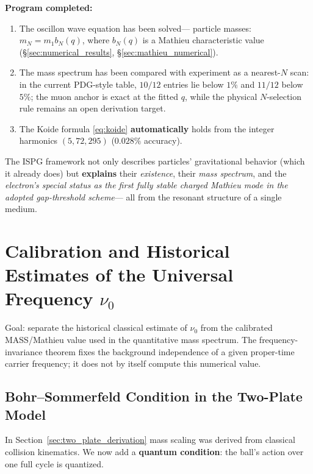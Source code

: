 \documentclass[11pt]{article}
\begin{document}
\textbf{Program completed:}
\begin{enumerate}
  \item[\checkmark] The oscillon wave equation has been solved---
    particle masses: $m_N = m_1 b_N(q)$, where $b_N(q)$ is a
    Mathieu characteristic value
    (\S\ref{sec:numerical_results},
    \S\ref{sec:mathieu_numerical}).
  \item[\checkmark] The mass spectrum has been compared with
    experiment as a nearest-$N$ scan: in the current
    PDG-style table, $10/12$ entries lie below $1\%$ and
    $11/12$ below $5\%$; the muon anchor is exact at the
    fitted $q$, while the physical $N$-selection rule remains
    an open derivation target.
  \item[\checkmark] The Koide formula \eqref{eq:koide}
    \textbf{automatically} holds from the integer harmonics
    $(5, 72, 295)$ ($0.028\%$ accuracy).
\end{enumerate}

The ISPG framework not only describes particles' gravitational
behavior (which it already does) but \textbf{explains} their
\emph{existence}, their \emph{mass spectrum}, and the
\emph{electron's special status as the first fully stable charged
Mathieu mode in the adopted gap-threshold scheme}---
all from the resonant structure of a single medium.

\section{Calibration and Historical Estimates of the Universal Frequency $\nu_0$}
\label{sec:nu0_computation}

Goal: separate the historical classical estimate of $\nu_0$ from
the calibrated MASS/Mathieu value used in the quantitative mass
spectrum.  The frequency-invariance theorem fixes the background
independence of a given proper-time carrier frequency; it does not
by itself compute this numerical value.

\subsection{Bohr--Sommerfeld Condition in the Two-Plate Model}

In Section~\ref{sec:two_plate_derivation} mass scaling was derived
from classical collision kinematics. We now add a \textbf{quantum
condition}: the ball's action over one full cycle is quantized.
\end{document}
